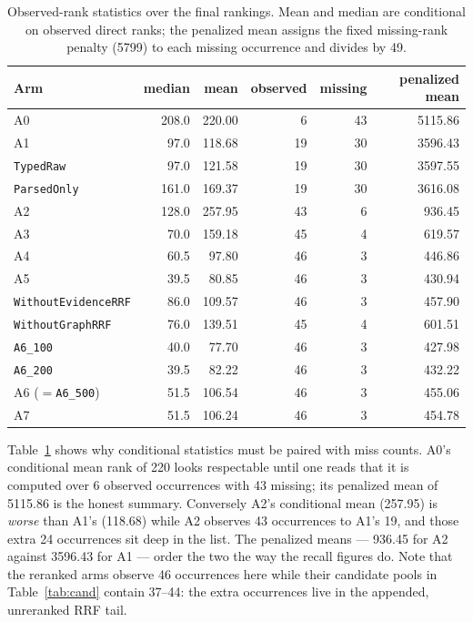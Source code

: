 \documentclass[11pt,a4paper]{article}
\begin{document}
\begin{table}[htbp]
\centering
\small
\caption{Observed-rank statistics over the final rankings. Mean and median are conditional on observed
direct ranks; the penalized mean assigns the fixed missing-rank penalty (5799) to each missing occurrence
and divides by 49.}
\label{tab:ranks}
\begin{tabular}{lrrrrr}
\toprule
Arm & median & mean & observed & missing & penalized mean \\
\midrule
A0                          & 208.0 & 220.00 &  6 & 43 & 5115.86 \\
A1                          &  97.0 & 118.68 & 19 & 30 & 3596.43 \\
\texttt{TypedRaw}           &  97.0 & 121.58 & 19 & 30 & 3597.55 \\
\texttt{ParsedOnly}         & 161.0 & 169.37 & 19 & 30 & 3616.08 \\
A2                          & 128.0 & 257.95 & 43 &  6 &  936.45 \\
A3                          &  70.0 & 159.18 & 45 &  4 &  619.57 \\
A4                          &  60.5 &  97.80 & 46 &  3 &  446.86 \\
A5                          &  39.5 &  80.85 & 46 &  3 &  430.94 \\
\texttt{WithoutEvidenceRRF} &  86.0 & 109.57 & 46 &  3 &  457.90 \\
\texttt{WithoutGraphRRF}    &  76.0 & 139.51 & 45 &  4 &  601.51 \\
\texttt{A6\_100}            &  40.0 &  77.70 & 46 &  3 &  427.98 \\
\texttt{A6\_200}            &  39.5 &  82.22 & 46 &  3 &  432.22 \\
A6 ($=$\texttt{A6\_500})    &  51.5 & 106.54 & 46 &  3 &  455.06 \\
A7                          &  51.5 & 106.24 & 46 &  3 &  454.78 \\
\bottomrule
\end{tabular}
\end{table}

Table~\ref{tab:ranks} shows why conditional statistics must be paired with miss counts. A0's conditional
mean rank of 220 looks respectable until one reads that it is computed over 6 observed occurrences with 43
missing; its penalized mean of 5115.86 is the honest summary. Conversely A2's conditional mean (257.95) is
\emph{worse} than A1's (118.68) while A2 observes 43 occurrences to A1's 19, and those extra 24 occurrences
sit deep in the list. The penalized means --- 936.45 for A2 against 3596.43 for A1 --- order the two the way
the recall figures do. Note that the reranked arms observe 46 occurrences here while their candidate pools
in Table~\ref{tab:cand} contain 37--44: the extra occurrences live in the appended, unreranked RRF tail.
\end{document}
